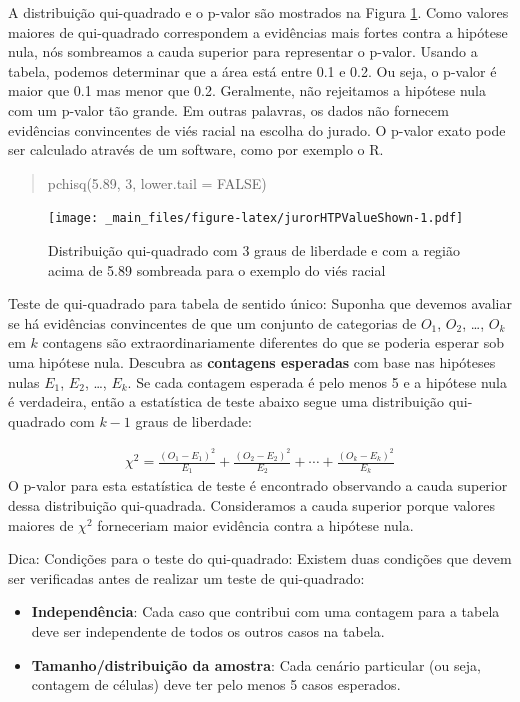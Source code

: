 \documentclass[
]{book}
\theoremstyle{definition}
\theoremstyle{definition}
\theoremstyle{definition}
\theoremstyle{definition}
\theoremstyle{remark}
\begin{document}
A distribuição qui-quadrado e o p-valor são mostrados na Figura \ref{fig:jurorHTPValueShown}. Como valores maiores de qui-quadrado correspondem a evidências mais fortes contra a hipótese nula, nós sombreamos a cauda superior para representar o p-valor. Usando a tabela, podemos determinar que a área está entre 0.1 e 0.2. Ou seja, o p-valor é maior que 0.1 mas menor que 0.2. Geralmente, não rejeitamos a hipótese nula com um p-valor tão grande. Em outras palavras, os dados não fornecem evidências convincentes de viés racial na escolha do jurado. O p-valor exato pode ser calculado através de um software, como por exemplo o R.

\begin{quote}
pchisq(5.89, 3, lower.tail = FALSE)
\end{quote}

\begin{figure}
\centering
\texttt{[image: \_main\_files/figure-latex/jurorHTPValueShown-1.pdf]}
\caption{\label{fig:jurorHTPValueShown}Distribuição qui-quadrado com 3 graus de liberdade e com a região acima de 5.89 sombreada para o exemplo do viés racial}
\end{figure}

Teste de qui-quadrado para tabela de sentido único: Suponha que devemos avaliar se há evidências convincentes de que um conjunto de categorias de \(O_1\), \(O_2\), \ldots, \(O_k\) em \(k\) contagens são extraordinariamente diferentes do que se poderia esperar sob uma hipótese nula. Descubra as \textbf{contagens esperadas} com base nas hipóteses nulas \(E_1\), \(E_2\), \ldots, \(E_k\). Se cada contagem esperada é pelo menos 5 e a hipótese nula é verdadeira, então a estatística de teste abaixo segue uma distribuição qui-quadrado com \(k-1\) graus de liberdade:

\begin{align*}
\chi^2 = \frac{(O_1 - E_1)^2}{E_1} + \frac{(O_2 - E_2)^2}{E_2} + \cdots + \frac{(O_k - E_k)^2}{E_k}
\end{align*}
O p-valor para esta estatística de teste é encontrado observando a cauda superior dessa distribuição qui-quadrada. Consideramos a cauda superior porque valores maiores de \(\chi^2\) forneceriam maior evidência contra a hipótese nula.

Dica: Condições para o teste do qui-quadrado: Existem duas condições que devem ser verificadas antes de realizar um teste de qui-quadrado:

\begin{itemize}
\item
  \textbf{Independência}: Cada caso que contribui com uma contagem para a tabela deve ser independente de todos os outros casos na tabela.
\item
  \textbf{Tamanho/distribuição da amostra}: Cada cenário particular (ou seja, contagem de células) deve ter pelo menos 5 casos esperados.
\end{itemize}
\end{document}
